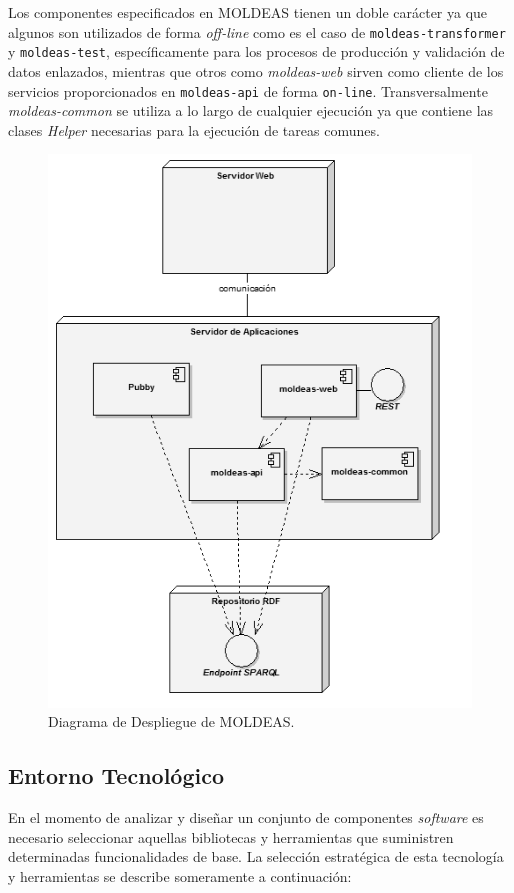 Los componentes especificados en MOLDEAS tienen un doble carácter ya que algunos son utilizados de forma \textit{off-line} como 
es el caso de \texttt{moldeas-transformer} y \texttt{moldeas-test}, específicamente para los procesos de producción y validación 
de datos enlazados, mientras que otros como \textit{moldeas-web} sirven como cliente de los servicios proporcionados 
en \texttt{moldeas-api} de forma \texttt{on-line}. Transversalmente \textit{moldeas-common} se utiliza a lo largo de cualquier 
ejecución ya que contiene las clases \textit{Helper} necesarias para la ejecución de tareas comunes.

\begin{figure}[!htb]
\centering
	\includegraphics[width=12cm]{images/phd/moldeas/moldeas-despliegue}
\caption{Diagrama de Despliegue de MOLDEAS.}
\label{fig:moldeas-despliegue}
\end{figure}

\subsection{Entorno Tecnológico}
En el momento de analizar y diseñar un conjunto de componentes \textit{software} es necesario seleccionar aquellas 
bibliotecas y herramientas que suministren determinadas funcionalidades de base. La selección estratégica 
de esta tecnología y herramientas se describe someramente a continuación:

